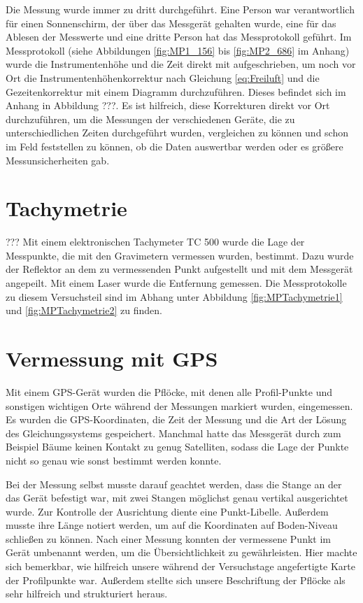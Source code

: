 Die Messung wurde immer zu dritt durchgeführt. Eine Person war verantwortlich für einen Sonnenschirm, der über das Messgerät gehalten wurde, eine für das Ablesen der Messwerte 
und eine dritte Person hat das Messprotokoll geführt. Im Messprotokoll (siehe Abbildungen \ref{fig:MP1_156} bis \ref{fig:MP2_686} im Anhang) wurde die Instrumentenhöhe und die Zeit direkt mit aufgeschrieben, um noch vor Ort die Instrumentenhöhenkorrektur nach Gleichung \eqref{eq:Freiluft} und die Gezeitenkorrektur mit einem Diagramm durchzuführen. Dieses befindet sich im Anhang in Abbildung ???. Es ist hilfreich, diese Korrekturen direkt vor Ort durchzuführen, um die Messungen der verschiedenen Geräte, die zu unterschiedlichen Zeiten durchgeführt wurden, vergleichen zu können und schon im Feld feststellen zu können, ob die Daten auswertbar werden oder es größere Messunsicherheiten gab.

\section{Tachymetrie}???
Mit einem elektronischen Tachymeter TC 500 wurde die Lage der Messpunkte, die mit den Gravimetern vermessen wurden, bestimmt. Dazu wurde der Reflektor an dem zu vermessenden Punkt aufgestellt und mit dem Messgerät angepeilt. Mit einem Laser wurde die Entfernung gemessen. Die Messprotokolle zu diesem Versuchsteil sind im Abhang unter Abbildung \ref{fig:MPTachymetrie1} und \ref{fig:MPTachymetrie2} zu finden.

\section{Vermessung mit GPS}

Mit einem GPS-Gerät wurden die Pflöcke, mit denen alle Profil-Punkte und sonstigen wichtigen Orte während der Messungen markiert wurden, eingemessen. Es wurden die GPS-Koordinaten, die Zeit der Messung und die Art der Lösung des Gleichungssystems gespeichert. Manchmal hatte das Messgerät durch zum Beispiel Bäume keinen Kontakt zu genug Satelliten, sodass die Lage der Punkte nicht so genau wie sonst bestimmt werden konnte.

Bei der Messung selbst musste darauf geachtet werden, dass die Stange an der das Gerät befestigt war, mit zwei Stangen möglichst genau vertikal ausgerichtet wurde. Zur Kontrolle der Ausrichtung diente eine Punkt-Libelle. Außerdem musste ihre Länge notiert werden, um auf die Koordinaten auf Boden-Niveau schließen zu können. Nach einer Messung konnten der vermessene Punkt im Gerät umbenannt werden, um die Übersichtlichkeit zu gewährleisten. Hier machte sich bemerkbar, wie hilfreich unsere während der Versuchstage angefertigte Karte der Profilpunkte war. Außerdem stellte sich unsere Beschriftung der Pflöcke als sehr hilfreich und strukturiert heraus.
